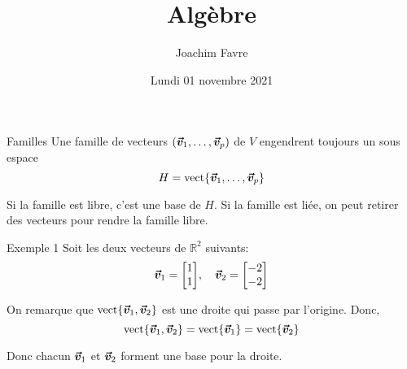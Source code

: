 \documentclass[a4paper]{article}
\title{Algèbre}
\author{Joachim Favre}
\date{Lundi 01 novembre 2021}
\begin{document}
\maketitle


\begin{parag}{Familles}
    Une famille de vecteurs $\left(\bvec{v}_1, \ldots, \bvec{v}_p\right)$ de $V$ engendrent toujours un sous espace
    \[H = \vect\left\{\bvec{v}_1, \ldots, \bvec{v}_p\right\}\]

    Si la famille est libre, c'est une base de $H$. Si la famille est liée, on peut retirer des vecteurs pour rendre la famille libre.
\end{parag}

\begin{parag}{Exemple 1}
    Soit les deux vecteurs de $\mathbb{R}^2$ suivants:
    \[\bvec{v}_1 = \begin{bmatrix} 1 \\ 1 \end{bmatrix}, \mathspace \bvec{v}_2 = \begin{bmatrix} -2 \\ -2 \end{bmatrix} \]


    On remarque que $\vect\left\{\bvec{v}_1, \bvec{v}_2\right\}$ est une droite qui passe par l'origine. Donc,
    \[\vect\left\{\bvec{v}_1, \bvec{v}_2\right\} = \vect\left\{\bvec{v}_1\right\} = \vect\left\{\bvec{v}_2\right\}\]

    Donc chacun $\bm{\protect\vec{v}}_1$ et $\bm{\protect\vec{v}}_2$ forment une base pour la droite.

\end{parag}
\end{document}
